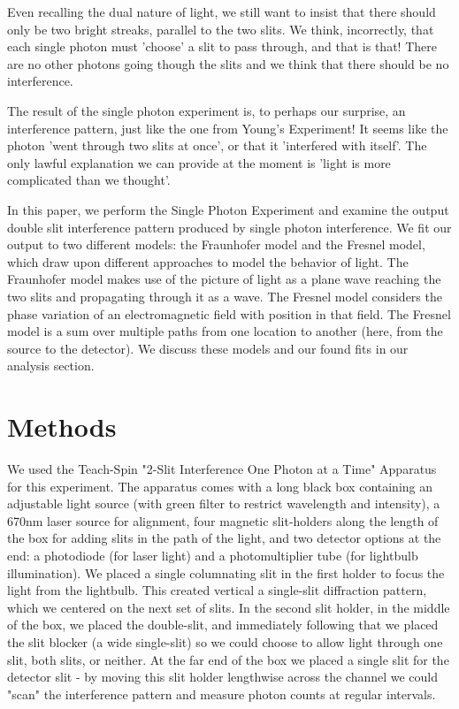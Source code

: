 \documentclass[prb,preprint]{revtex4-1}
\begin{document}
Even recalling the dual nature of light, we still want to insist that there should only be two bright streaks, parallel to the two slits.  We think, incorrectly, that each single photon must 'choose' a slit to pass through, and that is that!  There are no other photons going though the slits and we think that there should be no interference.  

The result of the single photon experiment is, to perhaps our surprise, an interference pattern, just like the one from Young's Experiment!  It seems like the photon 'went through two slits at once', or that it 'interfered with itself'.  The only lawful explanation we can provide at the moment is 'light is more complicated than we thought'.  

In this paper, we perform the Single Photon Experiment and examine the output double slit interference pattern produced by single photon interference.  We fit our output to two different models:  the Fraunhofer model and the Fresnel model, which draw upon different approaches to model the behavior of light.  The Fraunhofer model makes use of the picture of light as a plane wave reaching the two slits and propagating through it as a wave.  The Fresnel model considers the phase variation of an electromagnetic field with position in that field.  The Fresnel model is a sum over multiple paths from one location to another (here, from the source to the detector).  We discuss these models and our found fits in our analysis section.


\section{Methods}

We used the Teach-Spin "2-Slit Interference One Photon at a Time" Apparatus for this experiment.  The apparatus comes with a long black box containing an adjustable light source (with green filter to restrict wavelength and intensity), a 670nm laser source for alignment, four magnetic slit-holders along the length of the box for adding slits in the path of the light, and two detector options at the end: a photodiode (for laser light) and a photomultiplier tube (for lightbulb illumination).  We placed a single columnating slit in the first holder to focus the light from the lightbulb. This created vertical a single-slit diffraction pattern, which we centered on the next set of slits.  In the second slit holder, in the middle of the box, we placed the double-slit, and immediately following that we placed the slit blocker (a wide single-slit) so we could choose to allow light through one slit, both slits, or neither.  At the far end of the box we placed a single slit for the detector slit - by moving this slit holder lengthwise across the channel we could "scan" the interference pattern and measure photon counts at regular intervals.  
\end{document}
